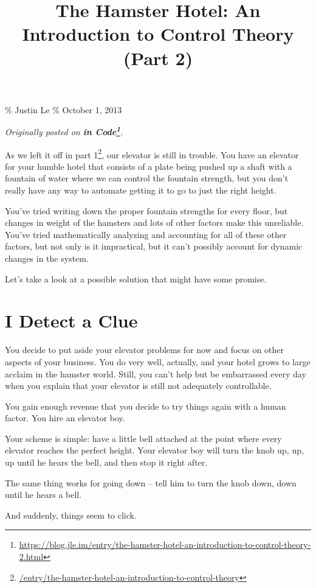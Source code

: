 \documentclass[]{article}
\title{The Hamster Hotel: An Introduction to Control Theory (Part 2)}
\renewcommand{\href}[2]{#2\footnote{\url{#1}}}
\begin{document}
\maketitle

\% Justin Le \% October 1, 2013

\emph{Originally posted on
\textbf{\href{https://blog.jle.im/entry/the-hamster-hotel-an-introduction-to-control-theory-2.html}{in
Code}}.}

As we left it off in
\href{/entry/the-hamster-hotel-an-introduction-to-control-theory}{part 1}, our
elevator is still in trouble. You have an elevator for your humble hotel that
consists of a plate being pushed up a shaft with a fountain of water where we
can control the fountain strength, but you don't really have any way to automate
getting it to go to just the right height.

You've tried writing down the proper fountain strengths for every floor, but
changes in weight of the hamsters and lots of other factors make this
unreliable. You've tried mathematically analyzing and accounting for all of
these other factors, but not only is it impractical, but it can't possibly
account for dynamic changes in the system.

Let's take a look at a possible solution that might have some promise.

\section{I Detect a Clue}\label{i-detect-a-clue}

You decide to put aside your elevator problems for now and focus on other
aspects of your business. You do very well, actually, and your hotel grows to
large acclaim in the hamster world. Still, you can't help but be embarrassed
every day when you explain that your elevator is still not adequately
controllable.

You gain enough revenue that you decide to try things again with a human factor.
You hire an elevator boy.

Your scheme is simple: have a little bell attached at the point where every
elevator reaches the perfect height. Your elevator boy will turn the knob up,
up, up until he hears the bell, and then stop it right after.

The same thing works for going down -- tell him to turn the knob down, down
until he hears a bell.

And suddenly, things seem to click.
\end{document}
